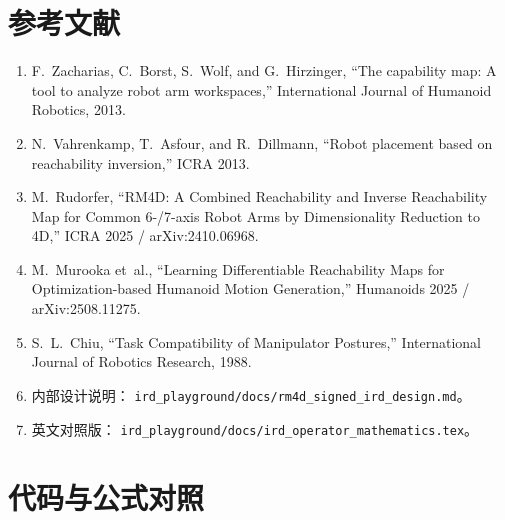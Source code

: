 \documentclass[UTF8,a4paper,11pt,fontset=fandol]{ctexart}
\begin{document}
\section{参考文献}
\label{sec:refs}

\begin{enumerate}[leftmargin=1.6em]
  \item F.~Zacharias, C.~Borst, S.~Wolf, and G.~Hirzinger,
        ``The capability map: A tool to analyze robot arm workspaces,''
        International Journal of Humanoid Robotics, 2013.
  \item N.~Vahrenkamp, T.~Asfour, and R.~Dillmann,
        ``Robot placement based on reachability inversion,'' ICRA 2013.
  \item M.~Rudorfer,
        ``RM4D: A Combined Reachability and Inverse Reachability Map for
        Common 6-/7-axis Robot Arms by Dimensionality Reduction to 4D,''
        ICRA 2025 / arXiv:2410.06968.
  \item M.~Murooka et~al.,
        ``Learning Differentiable Reachability Maps for Optimization-based
        Humanoid Motion Generation,'' Humanoids 2025 / arXiv:2508.11275.
  \item S.~L.~Chiu,
        ``Task Compatibility of Manipulator Postures,''
        International Journal of Robotics Research, 1988.
  \item 内部设计说明：
        \texttt{ird\_playground/docs/rm4d\_signed\_ird\_design.md}。
  \item 英文对照版：
        \texttt{ird\_playground/docs/ird\_operator\_mathematics.tex}。
\end{enumerate}

\appendix
\section{代码与公式对照}
\label{sec:code-map}
\end{document}
